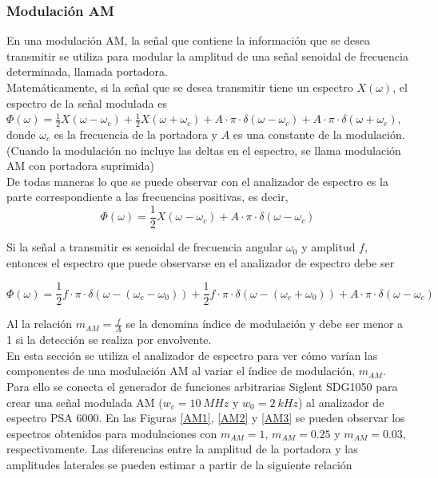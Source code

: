 \documentclass[a4paper,10pt]{article}
\begin{document}
		\subsubsection{Modulaci\'on AM}
		\indent En una modulaci\'on AM, la se\~nal que contiene la informaci\'on
		que se desea transmitir se utiliza para modular la amplitud de una 
		se\~nal senoidal de frecuencia determinada, llamada portadora. \\
		\indent Matem\'aticamente, si la se\~nal que se desea transmitir tiene 
		un espectro $X(\omega)$, el espectro de la se\~nal modulada es 
		$\Phi(\omega)=\frac{1}{2}X(\omega-\omega_c)+\frac{1}{2}X(
		\omega+\omega_c)+A\cdot\pi\cdot\delta(\omega-\omega_c)+A\cdot\pi\cdot
		\delta(\omega+\omega_c)$, donde $\omega_c$ es la frecuencia de la 
		portadora y $A$ es una constante de la modulaci\'on. (Cuando la 
		modulaci\'on no incluye las deltas en el espectro, se llama modulaci\'on
		AM con portadora suprimida) \\
		\indent De todas maneras lo que se puede observar con el analizador de 
		espectro es la parte correspondiente a las frecuencias positivas, es 
		decir,
		$$\Phi(\omega)=\frac{1}{2}X(\omega-\omega_c)+A\cdot\pi\cdot\delta(
		\omega-\omega_c)$$
		
		\indent Si la se\~nal a transmitir es senoidal de frecuencia angular 
		$\omega_0$ y amplitud $f$, entonces el espectro que puede observarse en 
		el analizador de espectro debe ser 
		
		$$\Phi(\omega)=\frac{1}{2}f\cdot\pi\cdot\delta(\omega-(\omega_c-\omega_0
		))+\frac{1}{2}f\cdot\pi\cdot\delta(\omega-(\omega_c+\omega_0))+A\cdot\pi
		\cdot\delta(\omega-\omega_c)$$
		
		\indent Al la relaci\'on $m_{AM}=\frac{f}{A}$ se la denomina \'indice de
		modulaci\'on y debe ser menor a 1 si la detecci\'on se realiza por 
		envolvente. \\
		\indent En esta secci\'on se utiliza el analizador de espectro para ver 
		c\'omo var\'ian las componentes de una modulaci\'on AM al variar el 
		\'indice de modulaci\'on, $m_{AM}$. Para ello se conecta el generador de
		funciones arbitrarias Siglent SDG1050 para crear una se\~nal modulada AM
		($w_c=10~MHz$ y $w_0=2~kHz$) al analizador de espectro PSA 6000. En las
		Figuras \ref{AM1}, \ref{AM2} y \ref{AM3} se pueden observar los 
		espectros obtenidos para modulaciones con $m_{AM}=1$, $m_{AM}=0.25$ y 
		$m_{AM}=0.03$, respectivamente. Las diferencias entre la amplitud de la 
		portadora y las amplitudes laterales se pueden estimar a partir de la 
		siguiente relaci\'on
\end{document}
